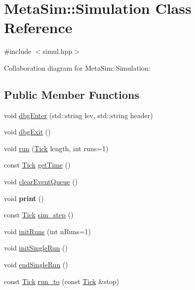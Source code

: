 \hypertarget{classMetaSim_1_1Simulation}{}\section{Meta\+Sim\+:\+:Simulation Class Reference}
\label{classMetaSim_1_1Simulation}


{\ttfamily \#include $<$simul.\+hpp$>$}



Collaboration diagram for Meta\+Sim\+:\+:Simulation\+:
\subsection*{Public Member Functions}
\begin{DoxyCompactItemize}
\item 
void \hyperlink{classMetaSim_1_1Simulation_a933df35120e8e0ee3fa3204d7e465323}{dbg\+Enter} (std\+::string lev, std\+::string header)
\item 
void \hyperlink{classMetaSim_1_1Simulation_a4619686b6133632beae97f4af3d78092}{dbg\+Exit} ()
\item 
void \hyperlink{classMetaSim_1_1Simulation_ad28462de8ce42a66b4319e1b49a499ec}{run} (\hyperlink{classMetaSim_1_1Tick}{Tick} length, int runs=1)
\item 
const \hyperlink{classMetaSim_1_1Tick}{Tick} \hyperlink{classMetaSim_1_1Simulation_ad5d3b77ec77e53d88be1ace99f957e87}{get\+Time} ()
\item 
void \hyperlink{classMetaSim_1_1Simulation_a75de7a10a8d62b283737bec56ad5456f}{clear\+Event\+Queue} ()
\item 
void {\bfseries print} ()\hypertarget{classMetaSim_1_1Simulation_a11e3774646883be33b004c6680d390e7}{}\label{classMetaSim_1_1Simulation_a11e3774646883be33b004c6680d390e7}

\item 
const \hyperlink{classMetaSim_1_1Tick}{Tick} \hyperlink{classMetaSim_1_1Simulation_a3e7f055482210de10d68fa6d93fb628d}{sim\+\_\+step} ()
\item 
void \hyperlink{classMetaSim_1_1Simulation_a8b556621a2c4efb505d8c8a93773271e}{init\+Runs} (int n\+Runs=1)
\item 
void \hyperlink{classMetaSim_1_1Simulation_ac8f7bba6a5931e6842404cc7a55b1fb5}{init\+Single\+Run} ()
\item 
void \hyperlink{classMetaSim_1_1Simulation_a90e6e0fdc8579f456fd49c992421285e}{end\+Single\+Run} ()
\item 
const \hyperlink{classMetaSim_1_1Tick}{Tick} \hyperlink{classMetaSim_1_1Simulation_af25030e87f1733ca9cd82f883833e458}{run\+\_\+to} (const \hyperlink{classMetaSim_1_1Tick}{Tick} \&stop)
\end{DoxyCompactItemize}
